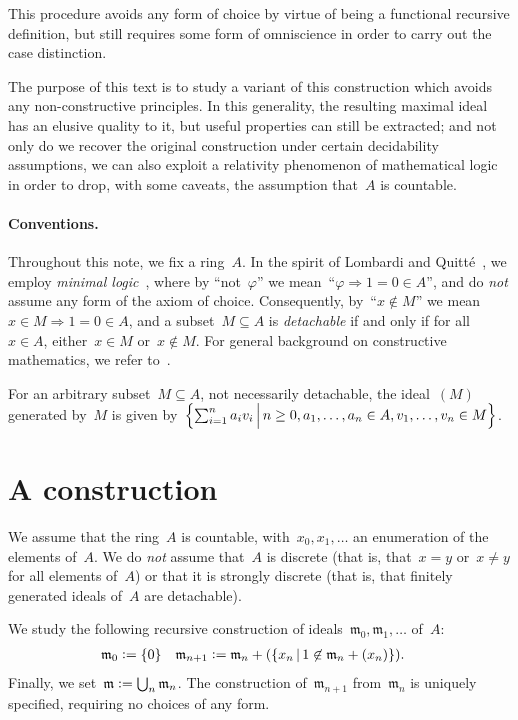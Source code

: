 \documentclass[envcountsect,envcountsame,runningheads]{llncs}
\newcommand{\mmm}{\mathfrak{m}}
\newcommand{\defeq}{\vcentcolon=}
\renewcommand{\_}{\mathpunct{.}\,}
\begin{document}
This procedure avoids any form of choice by virtue of being a
functional recursive definition, but still requires some form of omniscience in
order to carry out the case distinction.

The purpose of this text is to study a variant of this construction which
avoids any non-constructive principles. In this generality, the resulting
maximal ideal has an elusive quality to it, but useful properties can still be
extracted; and not only do we recover the original construction under certain
decidability assumptions, we can also exploit a relativity phenomenon of
mathematical logic in order to drop, with some caveats, the assumption that~$A$ is countable.

\paragraph{Conventions.} Throughout this note, we fix a ring~$A$.
In the spirit of Lombardi and Quitté~\cite{lombardi-quitte:constructive-algebra}, we employ \emph{minimal
logic}~\cite{johansson:minimal}, where by ``not~$\varphi$'' we mean~``$\varphi \Rightarrow 1 = 0 \in A$'', and do \emph{not} assume any form of the axiom of choice. Consequently,
by~``$x \not\in M$'' we mean~$x \in M \Rightarrow 1 = 0 \in A$, and a subset~$M
\subseteq A$ is \emph{detachable} if and only if for all~$x \in A$, either~$x \in M$
or~$x \not\in M$. For general background on constructive mathematics, we refer
to~\cite{bauer:five-stages,bauer:five-stages-talk,bauer:int-mathematics,sep:constructive-mathematics}.

For an arbitrary subset~$M \subseteq A$, not necessarily
detachable, the ideal~$(M)$ generated by~$M$ is given by~$\Bigl\{ \sum_{i=1}^n
a_i v_i \,\Big|\, n \geq 0, a_1,\ldots,a_n \in A, v_1,\ldots,v_n \in M \Bigr\}$.


\section{A construction}
\label{sect:constr}

We assume that the ring~$A$ is countable, with~$x_0, x_1, \ldots$ an
enumeration of the elements of~$A$. We do \emph{not} assume that~$A$ is
discrete (that is, that~$x = y$ or~$x \neq y$ for all elements of~$A$) or that
it is strongly discrete (that is, that finitely generated
ideals of~$A$ are detachable).

We study the following recursive construction of ideals~$\mmm_0, \mmm_1,
\ldots$ of~$A$:
\begin{align*}
  \mmm_0 &\defeq \{0\} &
  \mmm_{n+1} &\defeq \mmm_n + (\{ x_n \,|\, 1 \not\in \mmm_n + (x_n) \}).
\end{align*}
Finally, we set~$\mmm \defeq \bigcup_n \mmm_n$. The construction
of~$\mmm_{n+1}$ from~$\mmm_n$ is uniquely specified, requiring no choices of
any form.
\end{document}
